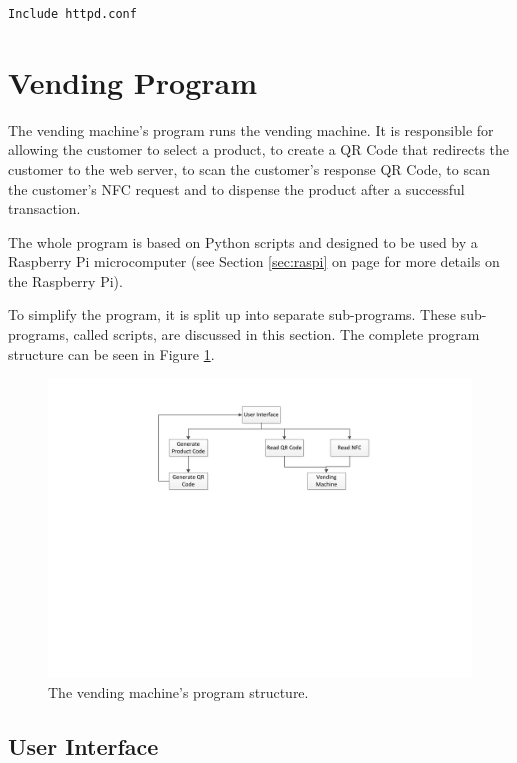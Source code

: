 \begin{verbatim}
Include httpd.conf
\end{verbatim}

\section{Vending Program}

The vending machine's program runs the vending machine. It is responsible for
allowing the customer to select a product, to create a QR Code that redirects
the customer to the web server, to scan the customer's response QR Code, to
scan the customer's NFC request and to dispense the product after a successful
transaction.

The whole program is based on Python scripts and
designed to be used by a Raspberry Pi microcomputer (see Section
\ref{sec:raspi} on page \pageref{sec:raspi} for more details on the Raspberry Pi).

To simplify the program, it is split up into separate sub-programs. These
sub-programs, called scripts, are discussed in this section. The complete
program structure can be seen in Figure \ref{fig:vm_prog_strcture}.

\begin{figure}
 \centering 
 \includegraphics[clip=true, trim = 100 350 0 50,
 scale=0.7]{vending_machine_program_structure}
 \caption{The vending machine's program structure.}
 \label{fig:vm_prog_strcture}
\end{figure}

\subsection{User Interface}

